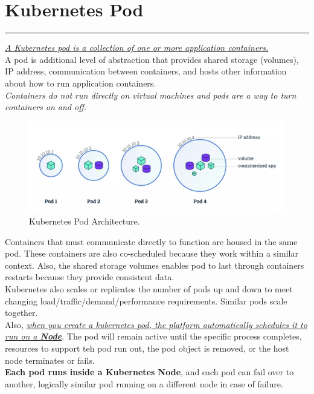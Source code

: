 \documentclass{article}
\begin{document}
\section{Kubernetes Pod}
\noindent
{\color{red} \rule{\linewidth}{0.5mm}}
\begin{tcolorbox}[colback=red!5!white, colframe=red!50!black,title=What is a Kubernetes Pod?]
   \underline{\textit{A Kubernetes pod is a collection of one or more application containers.}} \\
A pod is additional level of abstraction that provides shared storage (volumes), IP address, communication between containers, and hosts other information about how to run application containers.\\
\textit{Containers do not run directly on virtual machines and pods are a way to turn containers on and off.}
\end{tcolorbox}
\begin{figure}
\centering
\includegraphics[width=0.95\linewidth]{k8sDiagrams/k8sPodArchi.png}
\caption{\label{fig:k8s1}Kubernetes Pod Architecture.}
\end{figure} 
Containers that must communicate directly to function are housed in the same pod. These containers are also co-scheduled because they work within a similar context. Also, the shared storage volumes enables pod to last through containers restarts because they provide consistent data. \\
Kubernetes also scales or replicates the number of pods up and down to meet changing load/traffic/demand/performance requirements. Similar pods scale together. \\
Also, \underline{\textit{when you create a kubernetes pod, the platform automatically schedules it to run on a \textbf{Node}}}. The pod will remain active until the specific process completes, resources to support teh pod run out, the pod object is removed, or the host node terminates or fails.\\
\textbf{Each pod runs inside a Kubernetes Node}, and each pod can fail over to another, logically similar pod running on a different node in case of failure.\\
\end{document}
